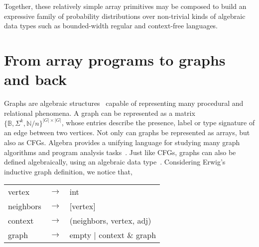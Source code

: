 \documentclass[sigplan,10pt,review,anonymous]{acmart}
\begin{document}
Together, these relatively simple array primitives may be composed to build an expressive family of probability distributions over non-trivial kinds of algebraic data types such as bounded-width regular and context-free languages.



%

\section{From array programs to graphs and back}\label{sec:graphs}

Graphs are algebraic structures~\cite{weisfeiler1968reduction} capable of representing many procedural and relational phenomena. A graph can be represented as a matrix $\{\mathbb{B}, \Sigma^k, \mathbb{N}/n\}^{|G|\times |G|}$, whose entries describe the presence, label or type signature of an edge between two vertices. Not only can graphs be represented as arrays, but also as CFGs. Algebra provides a unifying language for studying many graph algorithms and program analysis tasks~\citep{kepner2011graph}. Just like CFGs, graphs can also be defined algebraically, using an algebraic data type~\cite{mokhov2017algebraic}. Considering Erwig's~\citep{erwig2001inductive} inductive graph definition, we notice that,

  \begin{table}[H]
    \begin{tabular}{lcl}
      vertex  & $\rightarrow$ & int \\
      neighbors & $\rightarrow$ & [vertex] \\
      context & $\rightarrow$ & (neighbors, vertex, adj) \\
      graph   & $\rightarrow$ & empty | context \& graph \\
    \end{tabular}
  \end{table}
\end{document}

